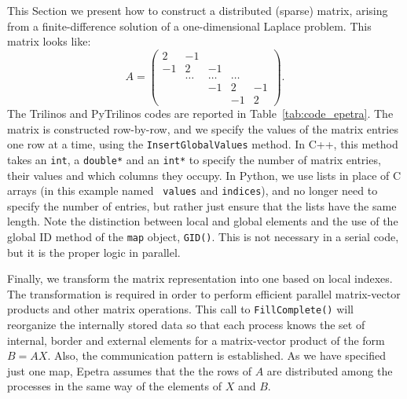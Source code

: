 \documentclass[10pt,relax]{SANDreport}
\begin{document}
This Section we present how to construct a
distributed (sparse) matrix, arising from a finite-difference solution
of a one-dimensional Laplace problem. This matrix looks like:
\begin{equation*}
  A = \begin{pmatrix}
     2 & -1     &        &        &    \\
    -1 &  2     & -1     &        &    \\
       & \ldots & \ldots & \ldots &    \\
       &        & -1     & 2      & -1 \\
       &        &        & -1     & 2
\end{pmatrix}.
\end{equation*}
The Trilinos and PyTrilinos codes are reported in Table~\ref{tab:code_epetra}.
The matrix is constructed row-by-row, and
we specify the values of the matrix entries one row at a time,
using the {\tt InsertGlobalValues} method.  In C++, this method takes
an {\tt int}, a {\tt double*} and an {\tt int*} to specify the number
of matrix entries, their values and which columns they occupy.  In
Python, we use lists in place of C arrays (in this example named {\tt
  values} and {\tt indices}), and no longer need to specify the number
of entries, but rather just ensure that the lists have the same
length.
Note the distinction between local and global elements and the use of
the global ID method of the {\tt map} object, {\tt GID()}.  This is
not necessary in a serial code, but it is the proper logic in
parallel.  

Finally, we transform the matrix representation into one based on
local indexes. The transformation is required in order to perform
efficient parallel matrix-vector products and other matrix operations.
This call to {\tt FillComplete()} will reorganize the internally
stored data so that each process knows the set of internal, border and
external elements for a matrix-vector product of the form $B =
AX$. Also, the communication pattern is established. As we have
specified just one map, Epetra assumes that the the rows of $A$ are
distributed among the processes in the same way of the elements of $X$
and $B$.
\end{document}
